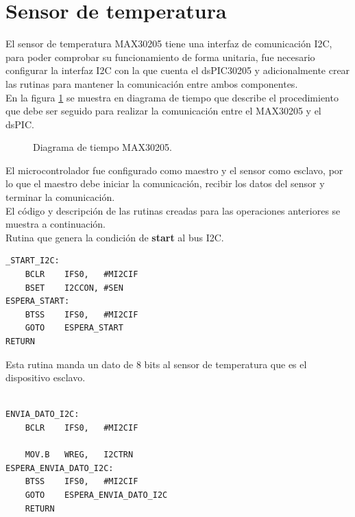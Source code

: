 \section{Sensor de temperatura}

El sensor de temperatura MAX30205 tiene una interfaz de comunicación I2C, para poder comprobar su funcionamiento de forma unitaria, fue necesario configurar la interfaz I2C con la que cuenta el dsPIC30205 y adicionalmente crear las rutinas para mantener la comunicación entre ambos componentes.\\

En la figura \ref{fig:DiagramaMAX30205} se muestra en diagrama de tiempo que describe el procedimiento que debe ser seguido para realizar la comunicación entre el MAX30205 y el dsPIC.\\


\begin{figure}[htbp!]
	\centering
	\caption{Diagrama de tiempo MAX30205.}
	\label{fig:DiagramaMAX30205}
\end{figure}


El microcontrolador fue configurado como maestro y el sensor como esclavo, por lo que el maestro debe iniciar la comunicación, recibir los datos del sensor y terminar la comunicación.\\

El código y descripción de las rutinas creadas para las operaciones anteriores se muestra a continuación.\\


Rutina que genera la condición de \textbf{start} al bus I2C.
{\small
\begin{lstlisting}[frame=single]
_START_I2C:
	BCLR	IFS0,	#MI2CIF
	BSET	I2CCON,	#SEN
ESPERA_START:
	BTSS	IFS0,	#MI2CIF
	GOTO	ESPERA_START
RETURN
\end{lstlisting}
}


Esta rutina manda un dato de 8 bits al sensor de temperatura que es el dispositivo esclavo.	
{\small
\begin{lstlisting}[frame=single]

ENVIA_DATO_I2C:
	BCLR	IFS0,	#MI2CIF
	
	MOV.B	WREG,	I2CTRN
ESPERA_ENVIA_DATO_I2C:
	BTSS	IFS0,	#MI2CIF
	GOTO	ESPERA_ENVIA_DATO_I2C
	RETURN
\end{lstlisting}
}

